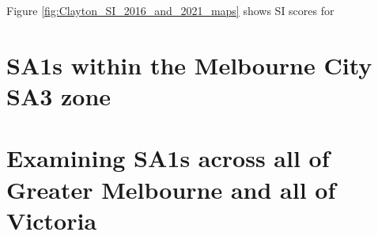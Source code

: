 \documentclass[]{tufte-book}
\begin{document}
Figure \ref{fig:Clayton_SI_2016_and_2021_maps} shows SI scores for

\hypertarget{sa1s-within-the-melbourne-city-sa3-zone}{%
\section{SA1s within the Melbourne City SA3
zone}\label{sa1s-within-the-melbourne-city-sa3-zone}}

\hypertarget{examining-sa1s-across-all-of-greater-melbourne-and-all-of-victoria}{%
\section{Examining SA1s across all of Greater Melbourne and all of
Victoria}\label{examining-sa1s-across-all-of-greater-melbourne-and-all-of-victoria}}

\renewcommand\refname{References}

\end{document}
